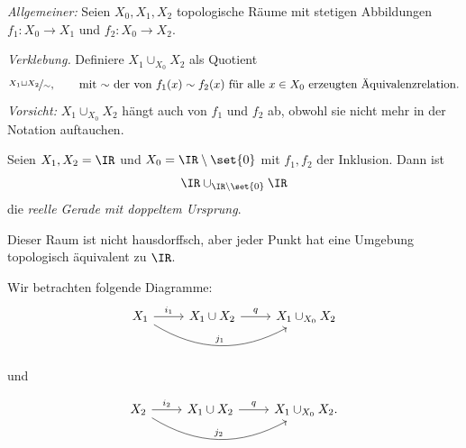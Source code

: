 \documentclass[language=ngerman]{TemplateLecture} %
\begin{document}
\emph{Allgemeiner:} Seien $X_0, X_1, X_2$ topologische Räume mit stetigen Abbildungen $f_1: X_0 \to X_1$ und $f_2: X_0 \to X_2$.

\emph{Verklebung.} Definiere $X_1 \cup_{X_0} X_2$ als Quotient 
\begin{equation*}
    \nicefrac{X_1 \sqcup X_2}{\sim}, \quad \quad \text{mit $\sim$ der von $f_1(x) \sim f_2(x)$ für alle $x \in X_0$ erzeugten Äquivalenzrelation.}
\end{equation*}
\emph{Vorsicht:} $X_1 \cup_{X_0} X_2$ hängt auch von $f_1$ und $f_2$ ab, obwohl sie nicht mehr in der Notation auftauchen.






\begin{example}
    Seien $X_1, X_2 = \IR$ und $X_0 = \IR \setminus \set{0}$ mit $f_1, f_2$ der Inklusion. Dann ist 
    \begin{equation*}
        \IR \cup_{\IR \setminus \set{0}} \IR
    \end{equation*}
    die \emph{reelle Gerade mit doppeltem Ursprung}.

    Dieser Raum ist nicht hausdorffsch, aber jeder Punkt hat eine Umgebung topologisch äquivalent zu $\IR$.
\end{example}

Wir betrachten folgende Diagramme:
\begin{equation*}
    \begin{tikzcd}
        X_1 \arrow[r, "i_1"] \arrow[rr, bend right, "j_1"] & X_1 \cup X_2 \arrow[r, "q"] & X_1 \cup_{X_0} X_2
    \end{tikzcd}
\end{equation*}

und 

\begin{equation*}
    \begin{tikzcd}
        X_2 \arrow[r, "i_2"] \arrow[rr, bend right, "j_2"] & X_1 \cup X_2 \arrow[r, "q"] & X_1 \cup_{X_0} X_2.
    \end{tikzcd}
\end{equation*}
\end{document}
